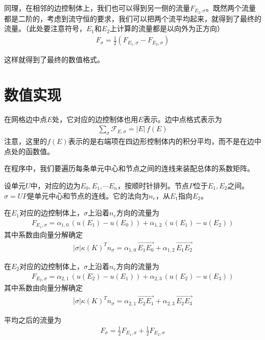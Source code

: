 \documentclass[12pt,a4paper]{article}
\theoremstyle{plain}
\begin{document}
同理，在相邻的边控制体上，我们也可以得到另一侧的流量$F_{E_2, \sigma}$。既然两个流量都是二阶的，考虑到流守恒的要求，我们可以把两个流平均起来，就得到了最终的流量。（此处要注意符号，$E_1$和$E_2$上计算的流量都是以向外为正方向）
\begin{align*}
F_{\sigma} = \frac12 (F_{E_1, \sigma} - F_{E_2, \sigma})
\end{align*}

这样就得到了最终的数值格式。

\section*{数值实现}

在网格边中点$E$处，它对应的边控制体也用$E$表示。边中点格式表示为
\begin{align*}
\sum_{\sigma} \mathcal{F}_{E, \sigma} = |E| \, f(E)
\end{align*}
注意，这里的$f(E)$表示的是右端项在四边形控制体内的积分平均，而不是在边中点处的函数值。

在程序中，我们要遍历每条单元中心和节点之间的连线来装配总体的系数矩阵。

设单元$U$中，对应的边为$E_0, E_1, \cdots E_n$，按顺时针排列。节点$P$位于$E_1, E_2$之间。$\sigma = U P$是单元中心和节点的连线。它的法向为$n_e$，从$E_1$指向$E_2$。

在$E_1$对应的边控制体上，$\sigma$上沿着$n_e$方向的流量为
\begin{align*}
F_{E_1, \sigma} = \alpha_{1,0} \, (u(E_1) - u(E_0)) + \alpha_{1,2} \, (u(E_1) - u(E_2))
\end{align*}
其中系数由向量分解确定
\begin{align*}
|\sigma| \kappa(K)^T n_{\sigma} = \alpha_{1,0} \, \overrightarrow{E_1 E_0} + \alpha_{1,2} \, \overrightarrow{E_1 E_2}
\end{align*}

在$E_2$对应的边控制体上，$\sigma$上沿着$n_e$方向的流量为
\begin{align*}
F_{E_2, \sigma} = \alpha_{2,1} \, (u(E_2) - u(E_1)) + \alpha_{2,3} \, (u(E_2) - u(E_3))
\end{align*}
其中系数由向量分解确定
\begin{align*}
|\sigma| \kappa(K)^T n_{\sigma} = \alpha_{2,1} \, \overrightarrow{E_2 E_1} + \alpha_{2,3} \, \overrightarrow{E_2 E_3}
\end{align*}

平均之后的流量为
\begin{align*}
F_{\sigma} = \frac12 F_{E_1, \sigma} + \frac12 F_{E_2, \sigma}
\end{align*}
\end{document}
